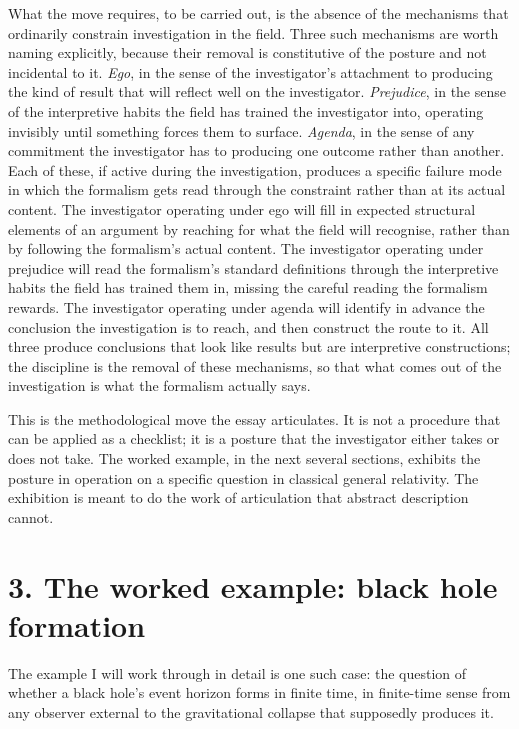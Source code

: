 \documentclass[11pt,a4paper]{article}
\begin{document}
What the move requires, to be carried out, is the absence of the mechanisms that ordinarily constrain investigation in the field. Three such mechanisms are worth naming explicitly, because their removal is constitutive of the posture and not incidental to it. \emph{Ego}, in the sense of the investigator's attachment to producing the kind of result that will reflect well on the investigator. \emph{Prejudice}, in the sense of the interpretive habits the field has trained the investigator into, operating invisibly until something forces them to surface. \emph{Agenda}, in the sense of any commitment the investigator has to producing one outcome rather than another. Each of these, if active during the investigation, produces a specific failure mode in which the formalism gets read through the constraint rather than at its actual content. The investigator operating under ego will fill in expected structural elements of an argument by reaching for what the field will recognise, rather than by following the formalism's actual content. The investigator operating under prejudice will read the formalism's standard definitions through the interpretive habits the field has trained them in, missing the careful reading the formalism rewards. The investigator operating under agenda will identify in advance the conclusion the investigation is to reach, and then construct the route to it. All three produce conclusions that look like results but are interpretive constructions; the discipline is the removal of these mechanisms, so that what comes out of the investigation is what the formalism actually says.

This is the methodological move the essay articulates. It is not a procedure that can be applied as a checklist; it is a posture that the investigator either takes or does not take. The worked example, in the next several sections, exhibits the posture in operation on a specific question in classical general relativity. The exhibition is meant to do the work of articulation that abstract description cannot.

\section*{3. The worked example: black hole formation}

The example I will work through in detail is one such case: the question of whether a black hole's event horizon forms in finite time, in finite-time sense from any observer external to the gravitational collapse that supposedly produces it.
\end{document}
